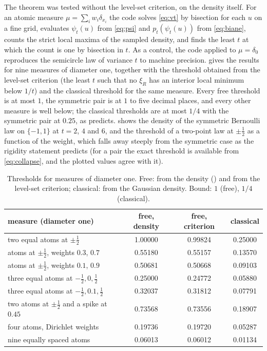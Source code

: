 \documentclass[11pt]{amsart}
\theoremstyle{definition}
\begin{document}
The theorem was tested without the level-set criterion, on the density itself. For an atomic measure $\mu=\sum_iw_i\delta_{x_i}$ the code solves \eqref{eq:vt} by bisection for each $u$ on a fine grid, evaluates $\psi_t(u)$ from \eqref{eq:psi} and $p_t(\psi_t(u))$ from \eqref{eq:biane}, counts the strict local maxima of the sampled density, and finds the least $t$ at which the count is one by bisection in $t$. As a control, the code applied to $\mu=\delta_0$ reproduces the semicircle law of variance $t$ to machine precision.  gives the results for nine measures of diameter one, together with the threshold obtained from the level-set criterion (the least $t$ such that no $\xi_R$ has an interior local minimum below $1/t$) and the classical threshold for the same measure. Every free threshold is at most $1$, the symmetric pair is at $1$ to five decimal places, and every other measure is well below; the classical thresholds are at most $1/4$ with the symmetric pair at $0.25$, as  predicts.  shows the density of the symmetric Bernoulli law on $\{-1,1\}$ at $t=2$, $4$ and $6$, and  the threshold of a two-point law at $\pm\frac12$ as a function of the weight, which falls away steeply from the symmetric case as the rigidity statement predicts (for a pair the exact threshold is available from \eqref{eq:collapse}, and the plotted values agree with it).

\begin{table}[ht]
\centering
\caption{Thresholds for measures of diameter one. Free: from the density () and from the level-set criterion; classical: from the Gaussian density. Bound: $1$ (free), $1/4$ (classical).}
\label{tab:thresholds}
\begin{tabular}{lccc}
\toprule
measure (diameter one) & free, density & free, criterion & classical \\
\midrule
two equal atoms at $\pm\tfrac12$ & 1.00000 & 0.99824 & 0.25000 \\
atoms at $\pm\tfrac12$, weights $0.3$, $0.7$ & 0.55180 & 0.55157 & 0.13570 \\
atoms at $\pm\tfrac12$, weights $0.1$, $0.9$ & 0.50681 & 0.50668 & 0.09103 \\
three equal atoms at $-\tfrac12, 0, \tfrac12$ & 0.25000 & 0.24772 & 0.05880 \\
three equal atoms at $-\tfrac12, 0.1, \tfrac12$ & 0.32037 & 0.31812 & 0.07791 \\
two atoms at $\pm\tfrac12$ and a spike at $0.45$ & 0.73568 & 0.73556 & 0.18907 \\
four atoms, Dirichlet weights & 0.19736 & 0.19720 & 0.05287 \\
nine equally spaced atoms & 0.06013 & 0.06012 & 0.01134 \\
\bottomrule
\end{tabular}
\end{table}
\end{document}
